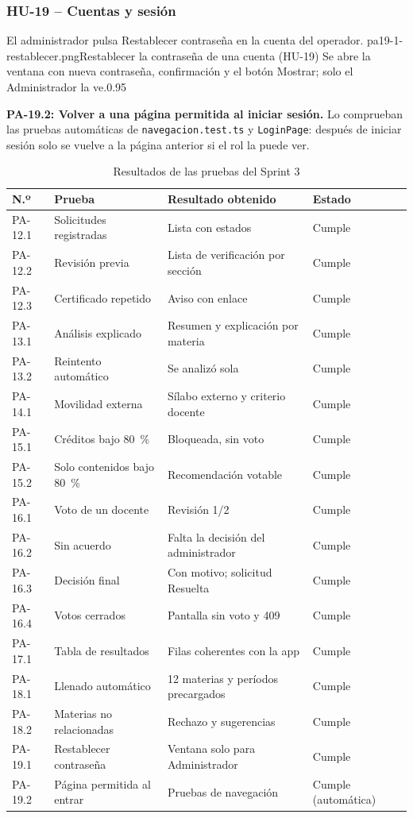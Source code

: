 \subsubsection{HU-19 -- Cuentas y sesión}

{El administrador pulsa Restablecer contraseña en la cuenta del operador.}
{pa19-1-restablecer.png}{Restablecer la contraseña de una cuenta (HU-19)}
{Se abre la ventana con nueva contraseña, confirmación y el botón Mostrar; solo el Administrador la ve.}{0.95}

\textbf{PA-19.2: Volver a una página permitida al iniciar sesión.} Lo comprueban las pruebas automáticas de
\texttt{navegacion.test.ts} y \texttt{LoginPage}: después de iniciar sesión solo se vuelve a la página anterior si el
rol la puede ver.

\begin{table}[H]\centering\small
\begin{tabularx}{\textwidth}{|l|X|X|l|}\hline
\rowcolor{grisTarjeta}\textbf{N.º} & \textbf{Prueba} & \textbf{Resultado obtenido} & \textbf{Estado}\\\hline
PA-12.1 & Solicitudes registradas & Lista con estados & Cumple\\\hline
PA-12.2 & Revisión previa & Lista de verificación por sección & Cumple\\\hline
PA-12.3 & Certificado repetido & Aviso con enlace & Cumple\\\hline
PA-13.1 & Análisis explicado & Resumen y explicación por materia & Cumple\\\hline
PA-13.2 & Reintento automático & Se analizó sola & Cumple\\\hline
PA-14.1 & Movilidad externa & Sílabo externo y criterio docente & Cumple\\\hline
PA-15.1 & Créditos bajo 80~\% & Bloqueada, sin voto & Cumple\\\hline
PA-15.2 & Solo contenidos bajo 80~\% & Recomendación votable & Cumple\\\hline
PA-16.1 & Voto de un docente & Revisión 1/2 & Cumple\\\hline
PA-16.2 & Sin acuerdo & Falta la decisión del administrador & Cumple\\\hline
PA-16.3 & Decisión final & Con motivo; solicitud Resuelta & Cumple\\\hline
PA-16.4 & Votos cerrados & Pantalla sin voto y 409 & Cumple\\\hline
PA-17.1 & Tabla de resultados & Filas coherentes con la app & Cumple\\\hline
PA-18.1 & Llenado automático & 12 materias y períodos precargados & Cumple\\\hline
PA-18.2 & Materias no relacionadas & Rechazo y sugerencias & Cumple\\\hline
PA-19.1 & Restablecer contraseña & Ventana solo para Administrador & Cumple\\\hline
PA-19.2 & Página permitida al entrar & Pruebas de navegación & Cumple (automática)\\\hline
\end{tabularx}
\caption{Resultados de las pruebas del Sprint 3}
\end{table}

